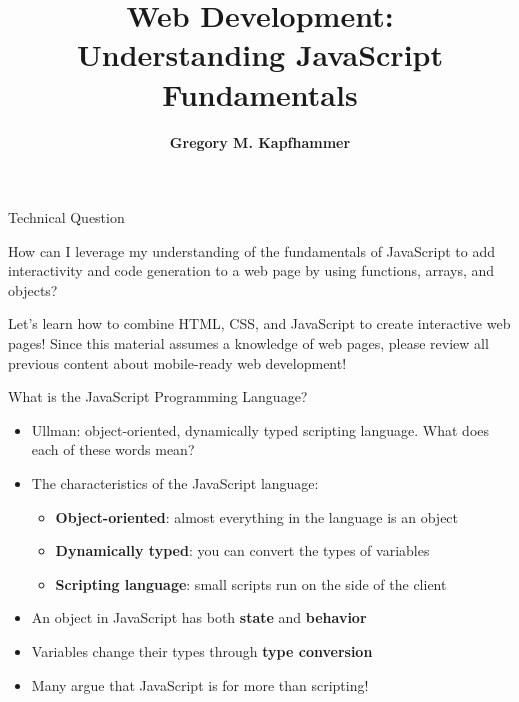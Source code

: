 \documentclass[14pt,aspectratio=169]{beamer}
\title{Web Development: \\ Understanding JavaScript Fundamentals}
\author{{\bf Gregory M. Kapfhammer}}
\institute[shortinst]{{\bf Department of Computer Science, Allegheny College}}
\begin{document}
{
  \begin{frame}
    \titlepage
  \end{frame}
}

%
\begin{frame}{Technical Question}
  \hspace*{.25in}
  \begin{minipage}{4.75in}
    \vspace*{.2in}
    \begin{center}
      {\large How can I leverage my understanding of the fundamentals of
        JavaScript to add interactivity and code generation to a web page by
      using functions, arrays, and objects?}
    \end{center}
  \end{minipage}
  \vspace{3ex}
  \begin{center}
    \small Let's learn how to combine HTML, CSS, and JavaScript to create
    interactive web pages! Since this material assumes a knowledge of web
    pages, please review all previous content about mobile-ready web
    development! \\
  \end{center}
\end{frame}

%
\begin{frame}{What is the JavaScript Programming Language?}
  \begin{itemize}
    \item Ullman: object-oriented, dynamically typed scripting language. What
      does each of these words mean?
      \vspace*{-.15in}
    \item The characteristics of the JavaScript language:
      \begin{itemize}
        \item {\bf Object-oriented}: almost everything in the language is an
          object
        \item {\bf Dynamically typed}: you can convert the types of variables
        \item {\bf Scripting language}: small scripts run on the side of the client
      \end{itemize}
      \vspace*{-.2in}
    \item An object in JavaScript has both {\bf state} and {\bf behavior}
      \vspace*{-.2in}
    \item Variables change their types through {\bf type conversion}
      \vspace*{-.2in}
    \item Many argue that JavaScript is for more than scripting!
  \end{itemize}
\end{frame}
\end{document}
